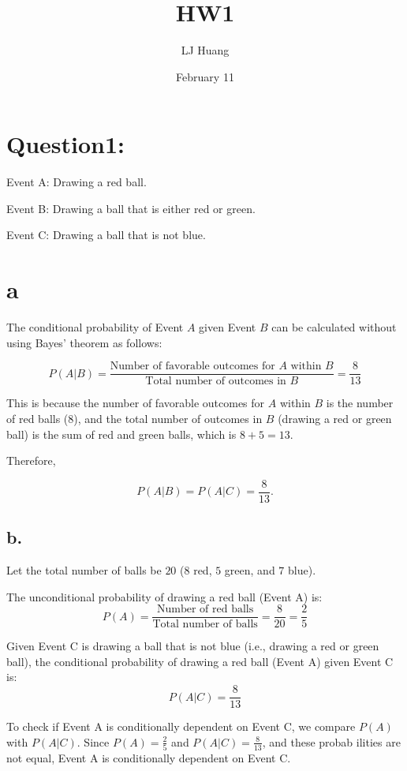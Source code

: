 \documentclass{article}
\title{HW1}
\author{LJ Huang}
\date{February 11}
\begin{document}
\maketitle
\section*{Question1:}
\indent\indent Event A: Drawing a red ball.

Event B: Drawing a ball that is either red or green.

Event C: Drawing a ball that is not blue.

\section*{a}

The conditional probability of Event \(A\) given Event \(B\) can be calculated 
\indent without using Bayes’ theorem as follows:

\[P(A|B) = \frac{\text{Number of favorable outcomes for } A \text{ within } B}{\text{Total number of outcomes in } B} = \frac{8}{13}\]

This is because the number of favorable outcomes for \(A\) within \(B\) is the 
\indent number of red balls (8), and the total number of outcomes in \(B\) (drawing a 
\indent red or green ball) is the sum of red and green balls, which is \(8 + 5 = 13\).

Therefore, 

\[P(A|B) = P(A|C) = \frac{8}{13}.\]

\subsection*{b.}

Let the total number of balls be $20$ ($8$ red, $5$ green, and $7$ blue).

The unconditional probability of drawing a red ball (Event A) is:
\[P(A) = \frac{\text{Number of red balls}}{\text{Total number of balls}} = \frac{8}{20} = \frac{2}{5}\]

Given Event C is drawing a ball that is not blue (i.e., drawing a red or 
\indent green ball), the conditional probability of drawing a red ball (Event A) given 
\indent Event C is:
\[P(A|C) = \frac{8}{13}\]

To check if Event A is conditionally dependent on Event C, we compare 
\indent $P(A)$ with $P(A|C)$. Since $P(A) = \frac{2}{5}$ and $P(A|C) = \frac{8}{13}$, and these probab
\indent ilities are not equal, Event A is conditionally dependent on Event C.
\end{document}
